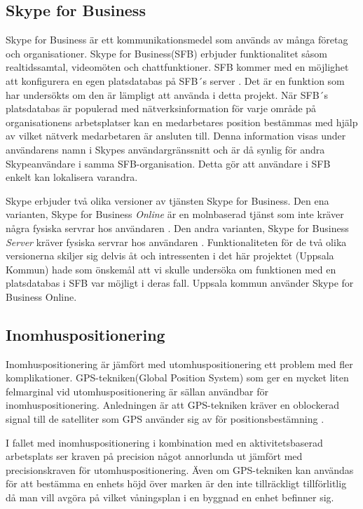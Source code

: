 \documentclass[swedish, a4paper,12pt]{article}
\begin{document}
\subsection{Skype for Business}
Skype for Business är ett kommunikationsmedel som används av många företag och organisationer. Skype for Business(SFB) erbjuder funktionalitet såsom realtidssamtal, videomöten och chattfunktioner. SFB kommer med en möjlighet att konfigurera en egen platsdatabas på SFB´s server \cite{Microsoft-Office}. Det är en funktion som har undersökts om den är lämpligt att använda i detta projekt. När SFB´s platsdatabas är populerad med nätverksinformation för varje område på organisationens arbetsplatser kan en medarbetares position bestämmas med hjälp av vilket nätverk medarbetaren är ansluten till. Denna information visas under användarens namn i Skypes användargränssnitt och är då synlig för andra Skypeanvändare i samma SFB-organisation. Detta gör att användare i SFB enkelt kan lokalisera varandra.

Skype erbjuder två olika versioner av tjänsten Skype for Business. Den ena varianten, Skype for Business \textit{Online} är en molnbaserad tjänst som inte kräver några fysiska servrar hos användaren \cite{SFBonline}.
Den andra varianten, Skype for Business \textit{Server} kräver fysiska servrar hos användaren \cite{SFBserver}. Funktionaliteten för de två olika versionerna skiljer sig delvis åt och intressenten i det här projektet (Uppsala Kommun) hade som önskemål att vi skulle undersöka om funktionen med en platsdatabas i SFB var möjligt i deras fall. Uppsala kommun använder Skype for Business Online.

\subsection{Inomhuspositionering}
Inomhuspositionering är jämfört med utomhuspositionering ett problem med fler komplikationer. GPS-tekniken(Global Position System) som ger en mycket liten felmarginal vid utomhuspositionering är sällan användbar för inomhuspositionering. Anledningen är att GPS-tekniken kräver en oblockerad signal till de satelliter som GPS använder sig av för positionsbestämning \cite{GPS_US_ACCURACY}.

I fallet med inomhuspositionering i kombination med en aktivitetsbaserad arbetsplats ser kraven på precision något annorlunda ut jämfört med precisionskraven för utomhuspositionering. Även om GPS-tekniken kan användas för att bestämma en enhets höjd över marken är den inte tillräckligt tillförlitlig då man vill avgöra på vilket våningsplan i en byggnad en enhet befinner sig.
\end{document}
